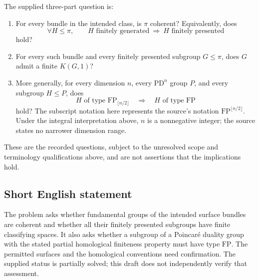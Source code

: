 \documentclass[11pt]{article}
\begin{document}
The supplied three-part question is:
\begin{enumerate}
\item For every bundle in the intended class, is \(\pi\) coherent? Equivalently, does
\[
\forall H\leq\pi,\qquad H\text{ finitely generated}\ \Longrightarrow\ H\text{ finitely presented}
\]
hold?
\item For every such bundle and every finitely presented subgroup \(G\leq\pi\), does \(G\) admit a finite \(K(G,1)\)?
\item More generally, for every dimension \(n\), every \(\mathrm{PD}^n\) group \(P\), and every subgroup \(H\leq P\), does
\[
H\text{ of type }\mathrm{FP}_{\lfloor n/2\rfloor}
\quad\Longrightarrow\quad
H\text{ of type }\mathrm{FP}
\]
hold? The subscript notation here represents the source's notation \(\mathrm{FP}^{\lfloor n/2\rfloor}\). Under the integral interpretation above, \(n\) is a nonnegative integer; the source states no narrower dimension range.
\end{enumerate}
These are the recorded questions, subject to the unresolved scope and terminology qualifications above, and are not assertions that the implications hold.
\subsection{Short English statement}
The problem asks whether fundamental groups of the intended surface bundles are coherent and whether all their finitely presented subgroups have finite classifying spaces. It also asks whether a subgroup of a Poincar\'e duality group with the stated partial homological finiteness property must have type \(\mathrm{FP}\). The permitted surfaces and the homological conventions need confirmation. The supplied status is partially solved; this draft does not independently verify that assessment.
\end{document}
